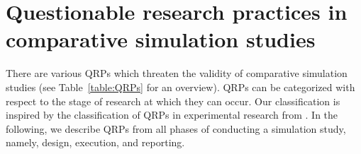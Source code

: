 \documentclass[a4paper, 11pt]{article}
\begin{document}
\section{Questionable research practices in comparative simulation studies} \label{sec:QRP} 

There are various QRPs which threaten the validity of comparative simulation 
studies (see Table~\ref{table:QRPs} for an overview). QRPs can be categorized
with respect to the stage of research at which they can occur. Our
classification is inspired by the classification of QRPs in experimental
research from \citet{Wicherts2016}. In the following, we describe QRPs from all
phases of conducting a simulation study, namely, design, execution, and reporting.
\end{document}
